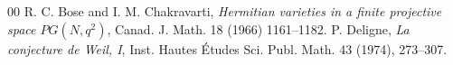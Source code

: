 \documentclass[a4paper,11pt]{article}
\begin{document}
\begin{thebibliography}{00}
R. C. Bose and I. M. Chakravarti,
{\em Hermitian varieties in a finite projective space $PG(N, q^2)$},
Canad. J. Math. 18 (1966) 1161--1182.
P. Deligne,
{\em La conjecture de Weil, {\rm I}},
Inst. Hautes \'{E}tudes Sci. Publ. Math. 43 (1974), 273--307.

\end{thebibliography}
\end{document}
